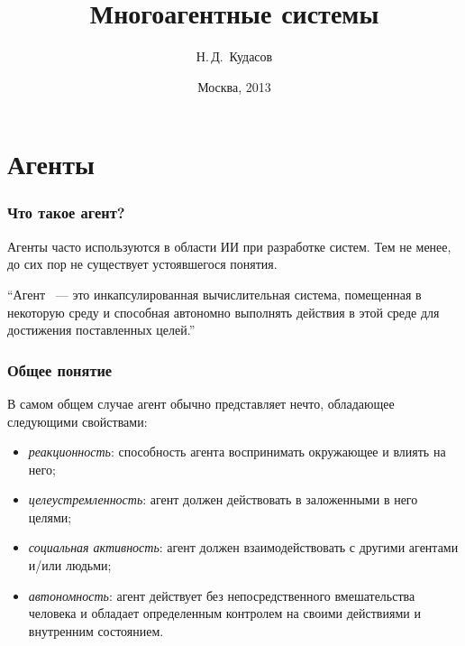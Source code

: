\documentclass{beamer}
\begin{document}
\title[]{Многоагентные системы}
\author{Н.\,Д.~Кудасов}

\institute{
    \vspace{2.0cm}
}
\date{Москва, 2013}

\begin{frame}
\addtocounter{framenumber}{-1}
\maketitle
\end{frame}

\section{Агенты}

\begin{frame}
\frametitle{Что такое агент?}
  Агенты часто используются в области ИИ при разработке систем.
  Тем не менее, до сих пор не существует устоявшегося понятия.

  \begin{exampleblock}{}
    {\large ``Агент ~--- это инкапсулированная вычислительная система,
    помещенная в некоторую среду и способная автономно выполнять действия
    в этой среде для достижения поставленных целей.''}
    \vskip5mm
    \hspace*{}
  \end{exampleblock}

\end{frame}

\begin{frame}
\frametitle{Общее понятие}
  В самом общем случае агент обычно представляет нечто, обладающее
  следующими свойствами:

  \begin{itemize}
    \item<1-> {\it реакционность}: способность агента воспринимать окружающее и влиять на него;
    \item<2-> {\it целеустремленность}: агент должен действовать в заложенными в него целями;
    \item<3-> {\it социальная активность}: агент должен взаимодействовать с другими агентами и/или людьми;
    \item<4-> {\it автономность}: агент действует без непосредственного вмешательства человека и обладает
      определенным контролем на своими действиями и внутренним состоянием.
  \end{itemize}
\end{frame}
\end{document}
